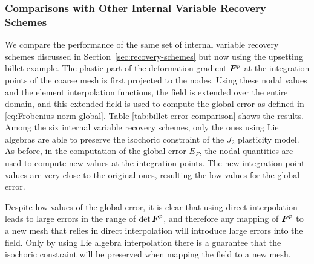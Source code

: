\documentclass[12pt]{article}
\begin{document}
\subsubsection{Comparisons with Other Internal Variable Recovery Schemes}

We compare the performance of the same set of internal variable recovery schemes
discussed in Section~\ref{sec:recovery-schemes} but now using the upsetting
billet example. The plastic part of the deformation gradient ${\boldsymbol{F}}^{p}$ at the
integration points of the coarse mesh is first projected to the nodes. Using
these nodal values and the element interpolation functions, the field is
extended over the entire domain, and this extended field is used to compute the
global error as defined in \eqref{eq:Frobenius-norm-global}.
Table \ref{tab:billet-error-comparison} shows the results. Among the six
internal variable recovery schemes, only the ones using Lie algebras are able to
preserve the isochoric constraint of the $J_2$ plasticity model. As before, in
the computation of the global error $E_F$, the nodal quantities are used to
compute new values at the integration points. The new integration point values
are very close to the original ones, resulting the low values for the global
error.

Despite low values of the global error, it is clear that using direct
interpolation leads to large errors in the range of $\det {\boldsymbol{F}}^p$, and therefore
any mapping of ${\boldsymbol{F}}^p$ to a new mesh that relies in direct interpolation will
introduce large errors into the field. Only by using Lie algebra interpolation
there is a guarantee that the isochoric constraint will be preserved when
mapping the field to a new mesh.
 
\end{document}
